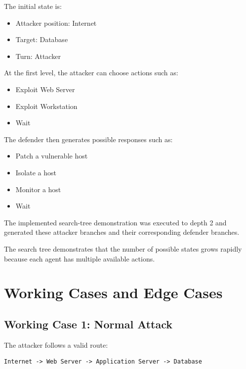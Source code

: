 \documentclass[12pt,a4paper]{article}
\begin{document}
The initial state is:

\begin{itemize}
    \item Attacker position: Internet
    \item Target: Database
    \item Turn: Attacker
\end{itemize}

At the first level, the attacker can choose actions such as:

\begin{itemize}
    \item Exploit Web Server
    \item Exploit Workstation
    \item Wait
\end{itemize}

The defender then generates possible responses such as:

\begin{itemize}
    \item Patch a vulnerable host
    \item Isolate a host
    \item Monitor a host
    \item Wait
\end{itemize}

The implemented search-tree demonstration was executed to depth 2 and
generated these attacker branches and their corresponding defender branches.

The search tree demonstrates that the number of possible states grows
rapidly because each agent has multiple available actions.


\section{Working Cases and Edge Cases}

\subsection{Working Case 1: Normal Attack}

The attacker follows a valid route:

\begin{verbatim}
Internet -> Web Server -> Application Server -> Database
\end{verbatim}
\end{document}
